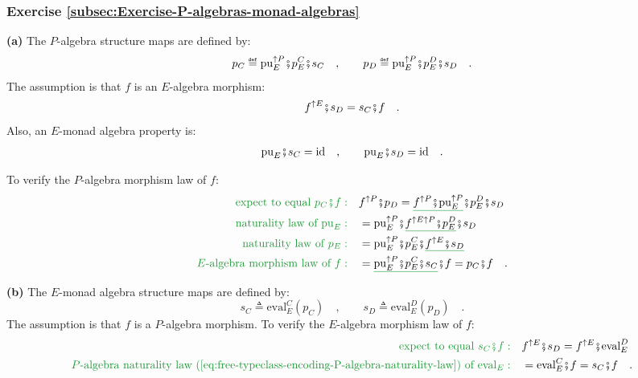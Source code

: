 
\subsubsection*{Exercise \ref{subsec:Exercise-P-algebras-monad-algebras}}

\textbf{(a)} The $P$-algebra structure maps are defined by:
\[
p_{C}\triangleq\text{pu}_{E}^{\uparrow P}\bef p_{E}^{C}\bef s_{C}\quad,\quad\quad p_{D}\triangleq\text{pu}_{E}^{\uparrow P}\bef p_{E}^{D}\bef s_{D}\quad.
\]
The assumption is that $f$ is an $E$-algebra morphism:
\[
f^{\uparrow E}\bef s_{D}=s_{C}\bef f\quad.
\]
Also, an $E$-monad algebra property is:
\[
\text{pu}_{E}\bef s_{C}=\text{id}\quad,\quad\quad\text{pu}_{E}\bef s_{D}=\text{id}\quad.
\]

To verify the $P$-algebra morphism law of $f$:
\begin{align*}
{\color{greenunder}\text{expect to equal }p_{C}\bef f:}\quad & f^{\uparrow P}\bef p_{D}=\gunderline{f^{\uparrow P}\bef\text{pu}_{E}^{\uparrow P}}\bef p_{E}^{D}\bef s_{D}\\
{\color{greenunder}\text{naturality law of }\text{pu}_{E}:}\quad & =\text{pu}_{E}^{\uparrow P}\bef\gunderline{f^{\uparrow E\uparrow P}\bef p_{E}^{D}}\bef s_{D}\\
{\color{greenunder}\text{naturality law of }p_{E}:}\quad & =\text{pu}_{E}^{\uparrow P}\bef p_{E}^{C}\bef\gunderline{f^{\uparrow E}\bef s_{D}}\\
{\color{greenunder}E\text{-algebra morphism law of }f:}\quad & =\gunderline{\text{pu}_{E}^{\uparrow P}\bef p_{E}^{C}\bef s_{C}}\bef f=p_{C}\bef f\quad.
\end{align*}

\textbf{(b)} The $E$-monad algebra structure maps are defined by:
\[
s_{C}\triangleq\text{eval}_{E}^{C}(p_{C})\quad,\quad\quad s_{D}\triangleq\text{eval}_{E}^{D}(p_{D})\quad.
\]
The assumption is that $f$ is a $P$-algebra morphism. To verify
the $E$-algebra morphism law of $f$:
\begin{align*}
{\color{greenunder}\text{expect to equal }s_{C}\bef f:}\quad & f^{\uparrow E}\bef s_{D}=f^{\uparrow E}\bef\text{eval}_{E}^{D}\\
{\color{greenunder}P\text{-algebra naturality law~(\ref{eq:free-typeclass-encoding-P-algebra-naturality-law}) of }\text{eval}_{E}:}\quad & =\text{eval}_{E}^{C}\bef f=s_{C}\bef f\quad.
\end{align*}



